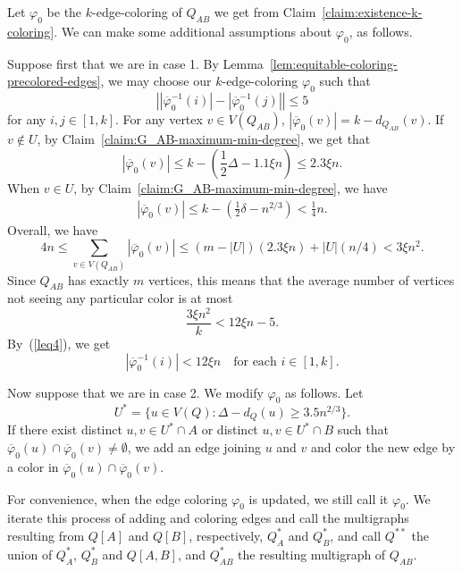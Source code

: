 \documentclass[11pt, oneside]{article}
\newcommand{\pbar}{\overline{\varphi}}
\begin{document}
Let $\varphi_0$ be the $k$-edge-coloring of $Q_{AB}$ we get from Claim~\ref{claim:existence-k-coloring}. We can make some additional assumptions about $\varphi_0$, as follows.

Suppose first that we are in case 1. By Lemma~\ref{lem:equitable-coloring-precolored-edges}, we may choose our $k$-edge-coloring $\varphi_0$  such that
\begin{equation}\label{leq4}
\left||\pbar_0^{-1}(i)| -|\pbar_0^{-1}(j)| \right| \le 5
\end{equation}
for any  $i,j\in [1,k]$.  For any vertex $v\in V(Q_{AB})$,  $|\pbar_0(v)| =k-d_{Q_{AB}}(v)$. 
If $v\not\in U$, 
by Claim~\ref{claim:G_AB-maximum-min-degree}, we get that
\begin{equation}\label{pbar_0v}
|\pbar_0(v)|\leq k-\left(\frac{1}{2}\Delta -1.1 \xi n\right) \le  2.3\xi n. 
\end{equation}
 When $v \in U$, by  Claim~\ref{claim:G_AB-maximum-min-degree}, we have 
\begin{eqnarray}
  |\pbar_0(v)|\leq k-\left(\frac{1}{2}\delta-n^{2/3}\right) <\frac{1}{4} n.  \label{eqn:miss-color-W-vertex}
\end{eqnarray}
Overall, we have 
\begin{equation}\label{eqn:total-number-missing-colors-Cases1-2}
    4n\le \sum_{v\in V(Q_{AB})} |\pbar_0(v)| \le (m-|U|)(2.3\xi n)+|U|(n/4) <3 \xi n^2. 
\end{equation}
Since $Q_{AB}$ has exactly $m$ vertices, this means that the average number of vertices not seeing any particular color is at most
$$
\frac{3 \xi n^2}{k}  < 12\xi n-5. 
$$
By~(\ref{leq4}), we get  
\begin{equation}\label{eqn1}
	|\pbar_0^{-1}(i)|< 12\xi n \quad \text{for each $i\in [1,k]$}.
\end{equation}


\medskip 

Now suppose that we are in case 2. We  modify $\varphi_0$ as follows. Let 
$$U^*=\{u\in V(Q): \Delta -d_{Q}(u) \ge  3.5n^{2/3}\}.$$
If there exist distinct $u,v\in U^*\cap A$  or distinct $u,v \in U^*\cap B$ such that $\pbar_0(u)\cap \pbar_0(v)\ne \emptyset$, we add an edge joining $u$ and $v$ and color the new edge by a color in $\pbar_0(u)\cap \pbar_0(v)$. 
    
    
   For convenience, when the edge coloring $\varphi_0$ is updated, we still call it $\varphi_0$. 
	We iterate this process of adding and coloring edges and call the  multigraphs  resulting from $Q[A]$ and $Q[B]$, respectively, $Q^*_A$ and $Q^*_B$, and call 
	$Q^{**}$ the union of $Q^*_A$, $Q^*_B$ and $Q[A,B]$, and $Q^*_{AB}$ the resulting multigraph of $Q_{AB}$.  
\end{document}
